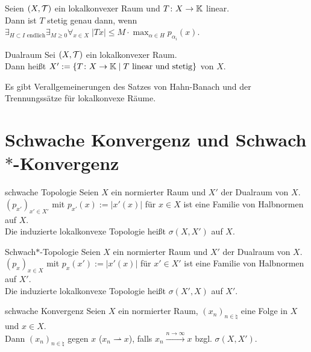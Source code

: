 \begin{Kor}
    Seien $(X, \mathcal{T})$ ein lokalkonvexer Raum und $T\colon X \rightarrow \mathbb{K}$ linear.\\
    Dann ist $T$ stetig genau dann, wenn
    $\exists_{H \subset I \text{ endlich}} \exists_{M \ge 0}
    \forall_{x \in X}\; |Tx| \le M \cdot \max_{\alpha \in H} p_{\alpha_i}(x)$.
\end{Kor}

\begin{Def}{Dualraum}
    Sei $(X, \mathcal{T})$ ein lokalkonvexer Raum.\\
    Dann heißt $X' := \{T\colon X \rightarrow \mathbb{K} \;|\; T \text{ linear und stetig}\}$
     von $X$.
\end{Def}

\begin{Bem}
    Es gibt Verallgemeinerungen des Satzes von Hahn-Banach und der Trennungssätze
    für lokalkonvexe Räume.
\end{Bem}

\pagebreak

\section{%
    Schwache Konvergenz und \texorpdfstring{Schwach$\ast$}{Schwach*}-Konvergenz%
}

\begin{Def}{schwache Topologie}
    Seien $X$ ein normierter Raum und $X'$ der Dualraum von $X$.\\
    $(p_{x'})_{x' \in X'}$ mit $p_{x'}(x) := |x'(x)|$ für $x \in X$ ist eine Familie von
    Halbnormen auf $X$.\\
    Die induzierte lokalkonvexe Topologie heißt 
    $\sigma(X, X')$ auf $X$.
\end{Def}

\begin{Def}{Schwach$\ast$-Topologie}
    Seien $X$ ein normierter Raum und $X'$ der Dualraum von $X$.\\
    $(p_x)_{x \in X}$ mit $p_x(x') := |x'(x)|$ für $x' \in X'$ ist eine Familie von
    Halbnormen auf $X'$.\\
    Die induzierte lokalkonvexe Topologie heißt 
    $\sigma(X', X)$ auf $X'$.
\end{Def}

\begin{Def}{schwache Konvergenz}
    Seien $X$ ein normierter Raum, $(x_n)_{n \in \natural}$ eine Folge in $X$ und $x \in X$.\\
    Dann  $(x_n)_{n \in \natural}$  gegen $x$
    ($x_n \rightharpoonup x$), falls
    $x_n \xrightarrow{n \to \infty} x$ bzgl. $\sigma(X, X')$.
\end{Def}

